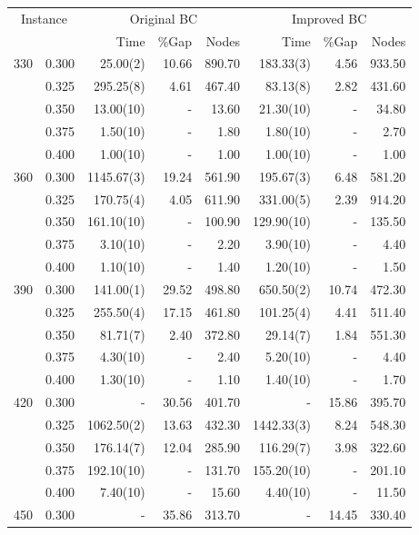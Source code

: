 \begin{table}[Hp]
\scriptsize
\begin{center}
\begin{tabular}{rr|rrr|rrr}
\hline
\multicolumn{2}{c|}{Instance} &
\multicolumn{3}{c|}{Original BC} &
\multicolumn{3}{c}{Improved BC} \\
	&		&		Time	&	\%Gap	&	Nodes	&		Time & \%Gap & Nodes  \\
\hline
330	&	0.300	&		25.00(2)	&	10.66	&	890.70	&		183.33(3)	&	4.56	&	933.50	\\
	&	0.325	&		295.25(8)	&	4.61	&	467.40	&		83.13(8)	&	2.82	&	431.60	\\
	&	0.350	&		13.00(10)	&	-	&	13.60	&		21.30(10)	&	-	&	34.80	\\
	&	0.375	&		1.50(10)	&	-	&	1.80	&		1.80(10)	&	-	&	2.70	\\
	&	0.400	&		1.00(10)	&	-	&	1.00	&		1.00(10)	&	-	&	1.00	\\
\hline
360	&	0.300	&		1145.67(3)	&	19.24	&	561.90	&		195.67(3)	&	6.48	&	581.20	\\
	&	0.325	&		170.75(4)	&	4.05	&	611.90	&		331.00(5)	&	2.39	&	914.20	\\
	&	0.350	&		161.10(10)	&	-	&	100.90	&		129.90(10)	&	-	&	135.50	\\
	&	0.375	&		3.10(10)	&	-	&	2.20	&		3.90(10)	&	-	&	4.40	\\
	&	0.400	&		1.10(10)	&	-	&	1.40	&		1.20(10)	&	-	&	1.50	\\
\hline
390	&	0.300	&		141.00(1)	&	29.52	&	498.80	&		650.50(2)	&	10.74	&	472.30	\\
	&	0.325	&		255.50(4)	&	17.15	&	461.80	&		101.25(4)	&	4.41	&	511.40	\\
	&	0.350	&		81.71(7)	&	2.40	&	372.80	&		29.14(7)	&	1.84	&	551.30	\\
	&	0.375	&		4.30(10)	&	-	&	2.40	&		5.20(10)	&	-	&	4.40	\\
	&	0.400	&		1.30(10)	&	-	&	1.10	&		1.40(10)	&	-	&	1.70	\\
\hline
420	&	0.300	&		-	&	30.56	&	401.70	&		-	&	15.86	&	395.70	\\
	&	0.325	&		1062.50(2)	&	13.63	&	432.30	&		1442.33(3)	&	8.24	&	548.30	\\
	&	0.350	&		176.14(7)	&	12.04	&	285.90	&		116.29(7)	&	3.98	&	322.60	\\
	&	0.375	&		192.10(10)	&	-	&	131.70	&		155.20(10)	&	-	&	201.10	\\
	&	0.400	&		7.40(10)	&	-	&	15.60	&		4.40(10)	&	-	&	11.50	\\
\hline
450	&	0.300	&		-	&	35.86	&	313.70	&		-	&	14.45	&	330.40	\\

\end{tabular}
\end{center}
\end{table}
